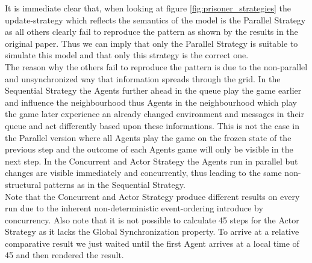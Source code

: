 It is immediate clear that, when looking at figure \ref{fig:prisoner_strategies} the update-strategy which reflects the semantics of the model is the Parallel Strategy as all others clearly fail to reproduce the pattern as shown by the results in the original paper. Thus we can imply that only the Parallel Strategy is suitable to simulate this model and that only this strategy is the correct one. \\
The reason why the others fail to reproduce the pattern is due to the non-parallel and unsynchronized way that information spreads through the grid. In the Sequential Strategy the Agents further ahead in the queue play the game earlier and influence the neighbourhood thus Agents in the neighbourhood which play the game later experience an already changed environment and  messages in their queue and act differently based upon these informations. This is not the case in the Parallel version where all Agents play the game on the frozen state of the previous step and the outcome of each Agents game will only be visible in the next step. In the Concurrent and Actor Strategy the Agents run in parallel but changes are visible immediately and concurrently, thus leading to the same non-structural patterns as in the Sequential Strategy. \\
Note that the Concurrent and Actor Strategy produce different results on every run due to the inherent non-deterministic event-ordering introduce by concurrency. Also note that it is not possible to calculate 45 steps for the Actor Strategy as it lacks the Global Synchronization property. To arrive at a relative comparative result we just waited until the first Agent arrives at a local time of 45 and then rendered the result. 

